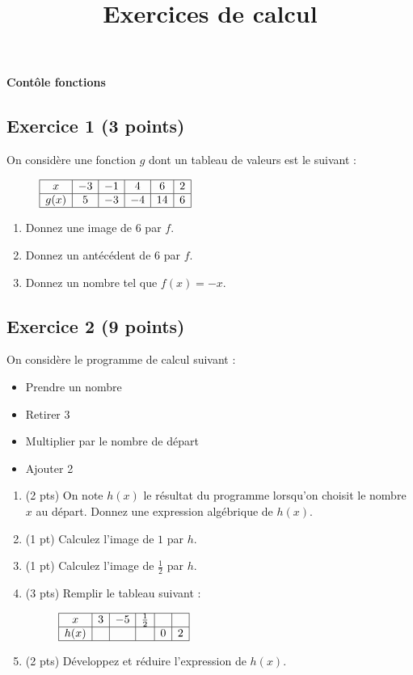 \documentclass[14 pt, fleqn, pstricks]{extarticle}
\title{Exercices de calcul}
\date{}
\theoremstyle{plain}
\begin{document}
	 
	 \begin{center} {\Large \textbf{Contôle fonctions}}
	 
\subsection*{Exercice 1 (3 points)}	 
	 
On considère une fonction $g$ dont un tableau de valeurs est le suivant : \begin{figure}[H]
\center
$\begin{array}{|c|c|c|c|c|c|}
\hline
 x &  -3 & -1 & 4 & 6  &  2 \\
\hline
g(x)&  5 & -3  & -4 & 14 &   6   \\
\hline
\end{array}$
\end{figure}	 

\begin{enumerate}
\item Donnez une image de $6$ par $f$. 
\item Donnez un antécédent de $6$ par $f$. 
\item Donnez un nombre tel que $f(x)= - x$.
\end{enumerate}


\subsection*{Exercice 2 (9 points) }	 
	 
On considère le programme de calcul suivant : 
\begin{itemize}
\item Prendre un nombre
\item Retirer 3
\item Multiplier par le nombre de départ 
\item Ajouter 2
\end{itemize}
\begin{enumerate}
\item (2 pts) On note $h(x)$ le résultat du programme lorsqu'on choisit le nombre $x$ au départ. Donnez une expression algébrique de $h(x)$.
\item (1 pt) Calculez l'image de $1$ par $h$. 
\item (1 pt) Calculez l'image de $\frac12$ par $h$.
\item (3 pts) Remplir le tableau suivant : 
	 
\begin{figure}[H]
\center
$\begin{array}{|c|c|c|c|c|c|}
\hline
 x &  3 & -5 & \frac12 &    &   \\
\hline
h(x)&   & & & 0 &  2   \\
\hline
\end{array}$
\end{figure}
\item (2 pts) Développez et réduire l'expression de $h(x)$. 
\end{enumerate} 


\end{center}
\end{document}
